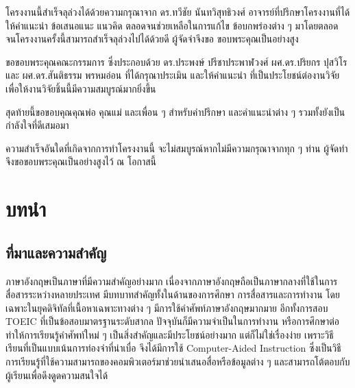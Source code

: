 \documentclass[12pt,oneside,openright,a4paper]{cpe-thai-project}
\begin{document}

\preface
\hspace{1cm}
โครงงานนี้สำเร็จลุล่วงได้ด้วยความกรุณาจาก ดร.ทวีชัย นันทวิสุทธิวงศ์ อาจารย์ที่ปรึกษาโครงงานที่ได้ให้คำแนะนำ ข้อเสนอแนะ แนวคิด ตลอดจนช่วยเหลือในการแก้ไข
ข้อบกพร่องต่าง ๆ มาโดยตลอด จนโครงงานครั้งนี้สามารถสำเร็จลุล่วงไปได้ด้วยดี ผู้จัดจำจึงขอ
ขอบพระคุณเป็นอย่างสูง

\hspace{1cm}
ขอขอบพระคุณคณะกรรมการ ซึ่งประกอบด้วย ดร.ประพงษ์ ปรีชาประพาฬวงศ์ ผศ.ดร.ปริยกร ปุสวิโร และ ผศ.ดร.สันติธรรม พรหมอ่อน ที่ได้กรุณาประเมิน และให้คำแนะนำ
ที่เป็นประโยชน์ต่องานวิจัยเพื่อให้งานวิจัยชิ้นนี้มีความสมบูรณ์มากยิ่งขึ้น

\hspace{1cm}
สุดท้ายนี้ขอขอบคุณคุณพ่อ คุณแม่ และเพื่อน ๆ สำหรับคำปรึกษา และคำแนะนำต่าง ๆ รวมทั้งยังเป็นกำลังใจที่ดีเสมอมา

\hspace{1cm}
ความสำเร็จอันใดที่เกิดจากการทำโครงงานนี้ จะไม่สมบูรณ์หากไม่มีความกรุณาจากทุก ๆ ท่าน ผู้จัดทำจึงขอขอบพระคุณเป็นอย่างสูงไว้ ณ โอกาสนี้

\tableofcontents
\listoftables
\listoffigures


\chapter{บทนำ}

\section{ที่มาและความสำคัญ}

\hspace{1cm}
ภาษาอังกฤษเป็นภาษาที่มีความสำคัญอย่างมาก เนื่องจากภาษาอังกฤษถือเป็นภาษากลางที่ใช้ในการสื่อสารระหว่างหลายประเทศ
มีบทบาทสำคัญทั้งในด้านของการศึกษา การสื่อสารและการทำงาน โดยเฉพาะในยุคดิจิทัลที่เนื้อหาเฉพาะทางต่าง ๆ มีการใช้คำศัพท์ภาษาอังกฤษมากมาย
อีกทั้งการสอบ TOEIC ที่เป็นข้อสอบมาตรฐานระดับสากล ปัจจุบันก็มีความจำเป็นในการทำงาน หรือการศึกษาต่อ
ทำให้การเรียนรู้คำศัพท์ใหม่ ๆ เป็นสิ่งสำคัญและมีประโยชน์อย่างมาก  แต่ก็ไม่ใช่เรื่องง่าย เพราะวิธีเรียนที่เป็นแบบเน้นการท่องจำที่น่าเบื่อ
จึงได้มีการใช้ Computer-Aided Instruction ซึ่งเป็นวิธีการเรียนรู้ที่ใช้ความสามารถของคอมพิวเตอร์มาช่วยนำเสนอสื่อหรือข้อมูลต่าง ๆ
และสามารถโต้ตอบกับผู้เรียนเพื่อดึงดูดความสนใจได้
\end{document}
